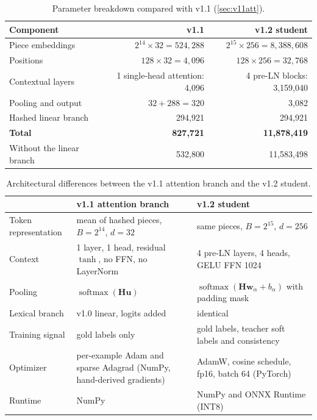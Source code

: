 \documentclass[11pt,a4paper]{article}
\theoremstyle{remark}
\DeclareMathOperator{\softmax}{softmax}
\begin{document}
\begin{table}[h]
\centering\small
\caption{Parameter breakdown compared with v1.1 (\cref{sec:v11att}).}
\label{tab:v12params}
\begin{tabular}{@{}l r r@{}}
\toprule
Component & v1.1 & v1.2 student \\
\midrule
Piece embeddings & $2^{14}\times32 = 524{,}288$ & $2^{15}\times256 = 8{,}388{,}608$ \\
Positions & $128\times32 = 4{,}096$ & $128\times256 = 32{,}768$ \\
Contextual layers & 1 single-head attention: 4{,}096 & 4 pre-LN blocks: 3{,}159{,}040 \\
Pooling and output & $32 + 288 = 320$ & 3{,}082 \\
Hashed linear branch & 294{,}921 & 294{,}921 \\
\midrule
\textbf{Total} & \textbf{827{,}721} & \textbf{11{,}878{,}419} \\
Without the linear branch & 532{,}800 & 11{,}583{,}498 \\
\bottomrule
\end{tabular}
\end{table}

\begin{table}[h]
\centering\small
\caption{Architectural differences between the v1.1 attention branch and the v1.2 student.}
\label{tab:v12diff}
\begin{tabularx}{\linewidth}{@{}l X X@{}}
\toprule
& v1.1 attention branch & v1.2 student \\
\midrule
Token representation & mean of hashed pieces, $B=2^{14}$, $d=32$ & same pieces, $B=2^{15}$, $d=256$ \\
Context & 1 layer, 1 head, residual $\tanh$, no FFN, no LayerNorm & 4 pre-LN layers, 4 heads, GELU FFN 1024 \\
Pooling & $\softmax(\bm H\bm u)$ & $\softmax(\bm H\bm w_\alpha + b_\alpha)$ with padding mask \\
Lexical branch & v1.0 linear, logits added & identical \\
Training signal & gold labels only & gold labels, teacher soft labels and consistency \\
Optimizer & per-example Adam and sparse Adagrad (NumPy, hand-derived gradients) & AdamW, cosine schedule, fp16, batch 64 (PyTorch) \\
Runtime & NumPy & NumPy and ONNX Runtime (INT8) \\
\bottomrule
\end{tabularx}
\end{table}
\end{document}
